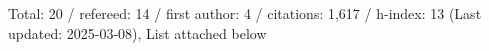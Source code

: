 Total: 20 / refereed: 14 / first author: 4 / citations: 1,617 / h-index: 13 (Last updated: 2025-03-08), List attached below